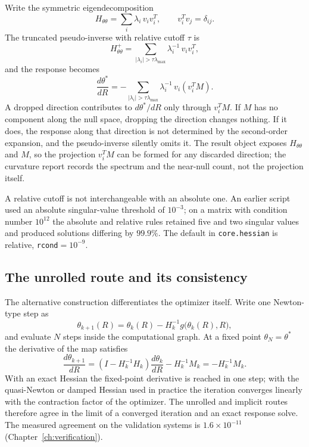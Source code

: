 Write the symmetric eigendecomposition
\begin{equation}
  H_{\theta\theta} = \sum_i \lambda_i\,v_i v_i^{T},
  \qquad
  v_i^{T}v_j=\delta_{ij}.
  \label{eq:hess-eig}
\end{equation}
The truncated pseudo-inverse with relative cutoff $\tau$ is
\begin{equation}
  H_{\theta\theta}^{+}
  = \sum_{|\lambda_i|>\tau\lambda_{\max}}
    \lambda_i^{-1}\,v_i v_i^{T},
  \label{eq:hess-pinv}
\end{equation}
and the response becomes
\begin{equation}
  \frac{d\theta^{*}}{dR}
  = -\sum_{|\lambda_i|>\tau\lambda_{\max}}
    \lambda_i^{-1}\,v_i\left(v_i^{T}M\right).
  \label{eq:hess-response-sum}
\end{equation}
A dropped direction contributes to $d\theta^{*}/dR$ only through
$v_i^{T}M$.  If $M$ has no component along the null space, dropping the
direction changes nothing.  If it does, the response along that
direction is not determined by the second-order expansion, and the
pseudo-inverse silently omits it.  The result object exposes
$H_{\theta\theta}$ and $M$, so the projection $v_i^{T}M$ can be formed
for any discarded direction; the curvature report records the spectrum
and the near-null count, not the projection itself.

A relative cutoff is not interchangeable with an absolute one.  An
earlier script used an absolute singular-value threshold of $10^{-3}$;
on a matrix with condition number $10^{12}$ the absolute and relative
rules retained five and two singular values and produced solutions
differing by $99.9\%$.  The default in \texttt{core.hessian} is
relative, \texttt{rcond}$=10^{-9}$.

\subsection{The unrolled route and its consistency}

The alternative construction differentiates the optimizer itself.
Write one Newton-type step as
\begin{equation}
  \theta_{k+1}(R)
  = \theta_k(R) - H_k^{-1}g\bigl(\theta_k(R),R\bigr),
  \label{eq:hess-newton-map}
\end{equation}
and evaluate $N$ steps inside the computational graph.  At a fixed
point $\theta_N=\theta^{*}$ the derivative of the map satisfies
\begin{equation}
  \frac{d\theta_{k+1}}{dR}
  = \left(I-H_k^{-1}H_k\right)\frac{d\theta_k}{dR}
    - H_k^{-1}M_k
  = -H_k^{-1}M_k.
  \label{eq:hess-unrolled}
\end{equation}
With an exact Hessian the fixed-point derivative is reached in one
step; with the quasi-Newton or damped Hessian used in practice the
iteration converges linearly with the contraction factor of the
optimizer.  The unrolled and implicit routes therefore agree in the
limit of a converged iteration and an exact response solve.  The
measured agreement on the validation systems is
$1.6\times10^{-11}$ (Chapter~\ref{ch:verification}).

